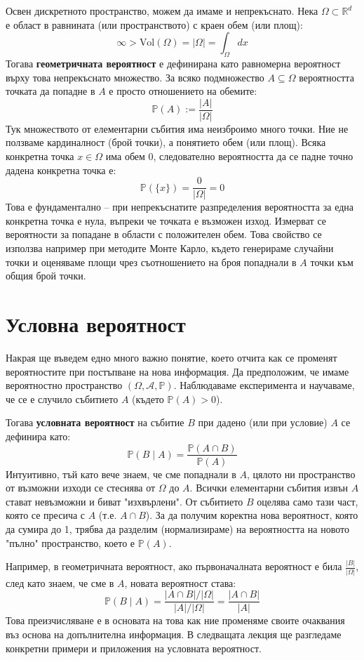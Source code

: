 \documentclass{article}
\begin{document}
Освен дискретното пространство, можем да имаме и непрекъснато. Нека $\Omega \subset \mathbb{R}^d$ е област в равнината (или пространството) с краен обем (или площ):
\[ \infty > \text{Vol}(\Omega) = |\Omega| = \int_{\Omega} dx \]
Тогава \textbf{геометричната вероятност} е дефинирана като равномерна вероятност върху това непрекъснато множество. За всяко подмножество $A \subseteq \Omega$ вероятността точката да попадне в $A$ е просто отношението на обемите:
\[ \mathbb{P}(A) := \frac{|A|}{|\Omega|} \]
Тук множеството от елементарни събития има неизброимо много точки. Ние не ползваме кардиналност (брой точки), а понятието обем (или площ). Всяка конкретна точка $x \in \Omega$ има обем $0$, следователно вероятността да се падне точно дадена конкретна точка е:
\[ \mathbb{P}(\{x\}) = \frac{0}{|\Omega|} = 0 \]
Това е фундаментално – при непрекъснатите разпределения вероятността за една конкретна точка е нула, въпреки че точката е възможен изход. Измерват се вероятности за попадане в области с положителен обем. Това свойство се използва например при методите Монте Карло, където генерираме случайни точки и оценяваме площи чрез съотношението на броя попаднали в $A$ точки към общия брой точки.

\section{Условна вероятност}

Накрая ще въведем едно много важно понятие, което отчита как се променят вероятностите при постъпване на нова информация. Да предположим, че имаме вероятностно пространство $(\Omega, \mathcal{A}, \mathbb{P})$. Наблюдаваме експеримента и научаваме, че се е случило събитието $A$ (където $\mathbb{P}(A) > 0$).

Тогава \textbf{условната вероятност} на събитие $B$ при дадено (или при условие) $A$ се дефинира като:
\[ \mathbb{P}(B \mid A) = \frac{\mathbb{P}(A \cap B)}{\mathbb{P}(A)} \]
Интуитивно, тъй като вече знаем, че сме попаднали в $A$, цялото ни пространство от възможни изходи се стеснява от $\Omega$ до $A$. Всички елементарни събития извън $A$ стават невъзможни и биват "изхвърлени". От събитието $B$ оцелява само тази част, която се пресича с $A$ (т.е. $A \cap B$).
За да получим коректна нова вероятност, която да сумира до 1, трябва да разделим (нормализираме) на вероятността на новото "пълно" пространство, което е $\mathbb{P}(A)$.

Например, в геометричната вероятност, ако първоначалната вероятност е била $\frac{|B|}{|\Omega|}$, след като знаем, че сме в $A$, новата вероятност става:
\[ \mathbb{P}(B \mid A) = \frac{|A \cap B| / |\Omega|}{|A| / |\Omega|} = \frac{|A \cap B|}{|A|} \]
Това преизчисляване е в основата на това как ние променяме своите очаквания въз основа на допълнителна информация. В следващата лекция ще разгледаме конкретни примери и приложения на условната вероятност.
\end{document}
